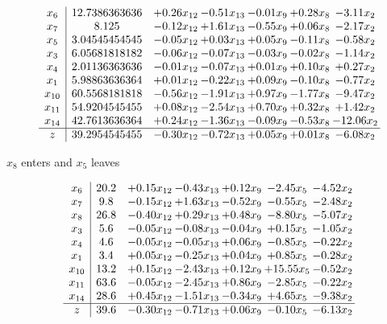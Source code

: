 \documentclass[9pt]{article}
\begin{document}
 \[\begin{array}{c| c c@{\hskip 2pt} c@{\hskip 2pt} c@{\hskip 2pt} c@{\hskip 2pt} c@{\hskip 2pt} }
 x_{6}   &  12.7386363636 & +  0.26 x_{12} & -0.51 x_{13} & -0.01 x_{9} & +  0.28 x_{8} & -3.11 x_{2}\\
 x_{7}   &  8.125 & -0.12 x_{12} & +  1.61 x_{13} & -0.55 x_{9} & +  0.06 x_{8} & -2.17 x_{2}\\
 x_{5}   &  3.04545454545 & -0.05 x_{12} & +  0.03 x_{13} & +  0.05 x_{9} & -0.11 x_{8} & -0.58 x_{2}\\
 x_{3}   &  6.05681818182 & -0.06 x_{12} & -0.07 x_{13} & -0.03 x_{9} & -0.02 x_{8} & -1.14 x_{2}\\
 x_{4}   &  2.01136363636 & -0.01 x_{12} & -0.07 x_{13} & +  0.01 x_{9} & +  0.10 x_{8} & +  0.27 x_{2}\\
 x_{1}   &  5.98863636364 & +  0.01 x_{12} & -0.22 x_{13} & +  0.09 x_{9} & -0.10 x_{8} & -0.77 x_{2}\\
 x_{10}   &  60.5568181818 & -0.56 x_{12} & -1.91 x_{13} & +  0.97 x_{9} & -1.77 x_{8} & -9.47 x_{2}\\
 x_{11}   &  54.9204545455 & +  0.08 x_{12} & -2.54 x_{13} & +  0.70 x_{9} & +  0.32 x_{8} & +  1.42 x_{2}\\
 x_{14}   &  42.7613636364 & +  0.24 x_{12} & -1.36 x_{13} & -0.09 x_{9} & -0.53 x_{8} & -12.06 x_{2}\\
\hline
z    &  39.2954545455 & -0.30 x_{12} & -0.72 x_{13} & +  0.05 x_{9} & +  0.01 x_{8} & -6.08 x_{2}\\
\end{array}\]


 $ x_{8} $ enters and $ x_{5} $ leaves 

 \[\begin{array}{c| c c@{\hskip 2pt} c@{\hskip 2pt} c@{\hskip 2pt} c@{\hskip 2pt} c@{\hskip 2pt} }
 x_{6}   &  20.2 & +  0.15 x_{12} & -0.43 x_{13} & +  0.12 x_{9} & -2.45 x_{5} & -4.52 x_{2}\\
 x_{7}   &  9.8 & -0.15 x_{12} & +  1.63 x_{13} & -0.52 x_{9} & -0.55 x_{5} & -2.48 x_{2}\\
 x_{8}   &  26.8 & -0.40 x_{12} & +  0.29 x_{13} & +  0.48 x_{9} & -8.80 x_{5} & -5.07 x_{2}\\
 x_{3}   &  5.6 & -0.05 x_{12} & -0.08 x_{13} & -0.04 x_{9} & +  0.15 x_{5} & -1.05 x_{2}\\
 x_{4}   &  4.6 & -0.05 x_{12} & -0.05 x_{13} & +  0.06 x_{9} & -0.85 x_{5} & -0.22 x_{2}\\
 x_{1}   &  3.4 & +  0.05 x_{12} & -0.25 x_{13} & +  0.04 x_{9} & +  0.85 x_{5} & -0.28 x_{2}\\
 x_{10}   &  13.2 & +  0.15 x_{12} & -2.43 x_{13} & +  0.12 x_{9} & + 15.55 x_{5} & -0.52 x_{2}\\
 x_{11}   &  63.6 & -0.05 x_{12} & -2.45 x_{13} & +  0.86 x_{9} & -2.85 x_{5} & -0.22 x_{2}\\
 x_{14}   &  28.6 & +  0.45 x_{12} & -1.51 x_{13} & -0.34 x_{9} & +  4.65 x_{5} & -9.38 x_{2}\\
\hline
z    &  39.6 & -0.30 x_{12} & -0.71 x_{13} & +  0.06 x_{9} & -0.10 x_{5} & -6.13 x_{2}\\
\end{array}\]
\end{document}
